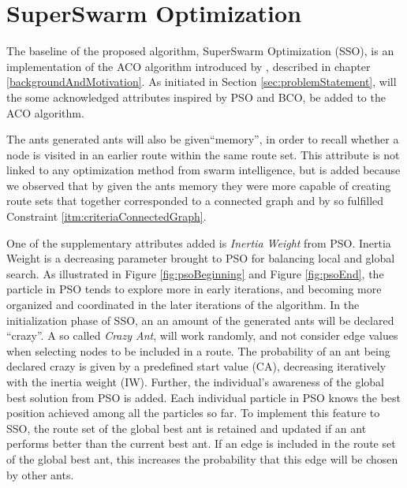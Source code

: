 \section{SuperSwarm Optimization}
\label{section:methodDescription}

The baseline of the proposed algorithm, SuperSwarm Optimization (SSO), is an implementation of the ACO algorithm introduced by \citet{nanda11}, described in chapter \vref{backgroundAndMotivation}. As initiated in Section \vref{sec:problemStatement}, will the some acknowledged attributes inspired by PSO and BCO, be added to the ACO algorithm. %

The ants generated ants will also be given``memory'', in order to recall whether a node is visited in an earlier route within the same route set. This attribute is not linked to any optimization method from swarm intelligence, but is added because we observed that by given the ants memory they were more capable of creating route sets that together corresponded to a connected graph and by so fulfilled Constraint \vref{itm:criteriaConnectedGraph}. 

One of the supplementary attributes added is \textit{Inertia Weight} from PSO. Inertia Weight is a decreasing parameter brought to PSO for balancing local and global search. As illustrated in Figure \vref{fig:psoBeginning} and Figure \vref{fig:psoEnd}, the particle in PSO tends to explore more in early iterations, and becoming more organized and coordinated in the later iterations of the algorithm. In the initialization phase of SSO, an an amount of the generated ants will be declared ``crazy''. A so called \textit{Crazy Ant}, will work randomly, and not consider edge values when selecting nodes to be included in a route. The probability of an ant being declared crazy is given by a predefined start value (CA), decreasing iteratively with the inertia weight (IW). %
Further, the individual's awareness of the global best solution from PSO is added. Each individual particle in PSO knows the best position achieved among all the particles so far. To implement this feature to SSO, the route set of the global best ant is retained and updated if an ant performs better than the current best ant. If an edge is included in the route set of the global best ant, this increases the probability that this edge will be chosen by other ants. 

